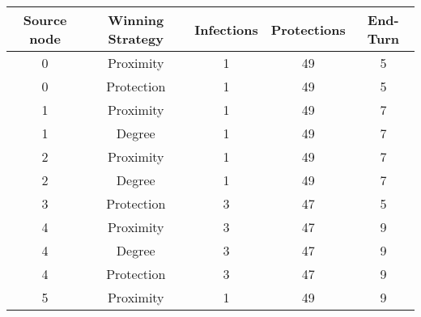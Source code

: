 \documentclass[results.tex]{subfiles}
\begin{document}
    \begin{center}
        \begin{tabular}{| c || c | c | c | c |}
            \hline
            {\bfseries Source node} & {\bfseries Winning Strategy} & {\bfseries Infections} & {\bfseries Protections}
            & {\bfseries End-Turn}
            \\  %
            \hline\hline
            0                       & Proximity                    & 1                      & 49                      & 5                    \\
            \hline
            0                       & Protection                   & 1                      & 49                      & 5                    \\
            \hline
            1                       & Proximity                    & 1                      & 49                      & 7                    \\
            \hline
            1                       & Degree                       & 1                      & 49                      & 7                    \\
            \hline
            2                       & Proximity                    & 1                      & 49                      & 7                    \\
            \hline
            2                       & Degree                       & 1                      & 49                      & 7                    \\
            \hline
            3                       & Protection                   & 3                      & 47                      & 5                    \\
            \hline
            4                       & Proximity                    & 3                      & 47                      & 9                    \\
            \hline
            4                       & Degree                       & 3                      & 47                      & 9                    \\
            \hline
            4                       & Protection                   & 3                      & 47                      & 9                    \\
            \hline
            5                       & Proximity                    & 1                      & 49                      & 9                    \\

\end{tabular}
\end{center}
\end{document}
